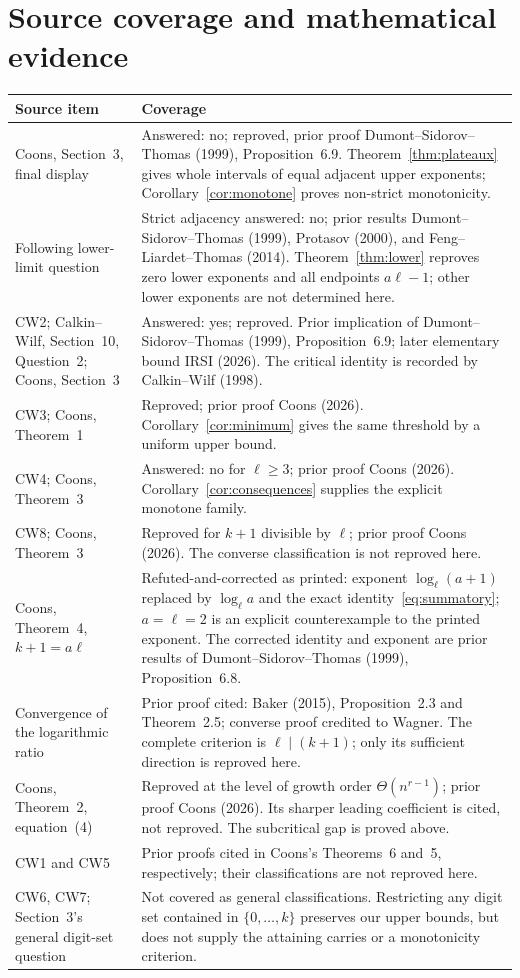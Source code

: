\documentclass[11pt]{article}
\begin{document}
\section{Source coverage and mathematical evidence}
\small
\setlength{\tabcolsep}{4pt}
\begin{longtable}{p{}p{}}
\toprule
Source item & Coverage \\
\midrule
\endhead
Coons, Section~3, final display &
Answered: no; reproved, prior proof Dumont--Sidorov--Thomas (1999),
Proposition~6.9. Theorem~\ref{thm:plateaux} gives whole intervals of equal
adjacent upper exponents; Corollary~\ref{cor:monotone} proves non-strict
monotonicity. \\
Following lower-limit question &
Strict adjacency answered: no; prior results Dumont--Sidorov--Thomas
(1999), Protasov (2000), and Feng--Liardet--Thomas (2014).
Theorem~\ref{thm:lower} reproves zero
lower exponents and all endpoints $a\ell-1$; other lower exponents
are not determined here. \\
CW2; Calkin--Wilf, Section~10, Question~2; Coons, Section~3 &
Answered: yes; reproved. Prior implication of Dumont--Sidorov--Thomas
(1999), Proposition~6.9; later elementary bound IRSI (2026).
The critical identity is recorded by Calkin--Wilf (1998). \\
CW3; Coons, Theorem~1 &
Reproved; prior proof Coons (2026). Corollary~\ref{cor:minimum}
gives the same threshold by a uniform upper bound. \\
CW4; Coons, Theorem~3 &
Answered: no for $\ell\ge3$; prior proof Coons (2026).
Corollary~\ref{cor:consequences} supplies the explicit monotone family. \\
CW8; Coons, Theorem~3 &
Reproved for $k+1$ divisible by $\ell$; prior proof Coons (2026).
The converse classification is not reproved here. \\
Coons, Theorem~4, $k+1=a\ell$ &
Refuted-and-corrected as printed: exponent $\log_\ell(a+1)$ replaced
by $\log_\ell a$ and the exact identity~\eqref{eq:summatory};
$a=\ell=2$ is an explicit counterexample to the printed exponent.
The corrected identity and exponent are prior results of
Dumont--Sidorov--Thomas (1999), Proposition~6.8. \\
Convergence of the logarithmic ratio &
Prior proof cited: Baker (2015), Proposition~2.3 and Theorem~2.5;
converse proof credited to Wagner. The complete criterion is
$\ell\mid(k+1)$; only its sufficient direction is reproved here. \\
Coons, Theorem~2, equation~(4) &
Reproved at the level of growth order $\Theta(n^{r-1})$;
prior proof Coons (2026). Its sharper leading coefficient is cited,
not reproved. The subcritical gap is proved above. \\
CW1 and CW5 &
Prior proofs cited in Coons's Theorems~6 and~5, respectively;
their classifications are not reproved here. \\
CW6, CW7; Section~3's general digit-set question &
Not covered as general classifications. Restricting any digit set
contained in $\{0,\ldots,k\}$ preserves our upper bounds, but
does not supply the attaining carries or a monotonicity criterion. \\
\bottomrule
\end{longtable}
\end{document}
